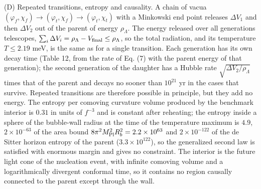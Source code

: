 \documentclass[11pt,a4paper]{article}
\begin{document}
(D) Repeated transitions, entropy and causality. A chain of vacua $(\varphi_f,\chi_f)\to(\varphi_t,\chi_f)\to(\varphi_t,\chi_t)$ with a Minkowski end point releases $\Delta V_1$ and then $\Delta V_2$ out of the parent of energy $\rho_\Lambda$. The energy released over all generations telescopes, $\sum_i\Delta V_i=\rho_\Lambda-V_{\rm final}\le\rho_\Lambda$, so the total radiation, and its temperature $T\le2.19$ meV, is the same as for a single transition. Each generation has its own decay time (Table 12, from the rate of Eq. (7) with the parent energy of that generation); the second generation of the daughter has a Hubble rate $\sqrt{\Delta V_2/\rho_\Lambda}$ times that of the parent and decays no sooner than $10^{21}$ yr in the cases that survive. Repeated transitions are therefore possible in principle, but they add no energy. The entropy per comoving curvature volume produced by the benchmark interior is $0.31$ in units of $f^{-3}$ and is constant after reheating; the entropy inside a sphere of the bubble-wall radius at the time of the temperature maximum is $4.9$, $2\times10^{-63}$ of the area bound $8\pi^2M_{\rm Pl}^2R_b^2=2.2\times10^{63}$ and $2\times10^{-122}$ of the de Sitter horizon entropy of the parent ($3.3\times10^{122}$), so the generalized second law is satisfied with enormous margin and gives no constraint. The interior is the future light cone of the nucleation event, with infinite comoving volume and a logarithmically divergent conformal time, so it contains no region causally connected to the parent except through the wall.
\end{document}
